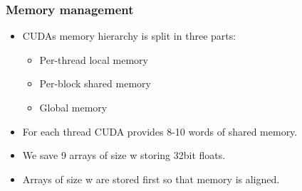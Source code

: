 \begin{frame}
  \frametitle{Memory management}
  \begin{itemize}
    \item CUDAs memory hierarchy is split in three parts:
      \begin{itemize}
        \item Per-thread local memory
        \item Per-block shared memory
        \item Global memory
      \end{itemize}
    \item For each thread CUDA provides 8-10 words of shared memory.
    \item We save 9 arrays of size w storing 32bit floats.
    \item Arrays of size w are stored first so that memory is aligned.
  \end{itemize}
\end{frame}
